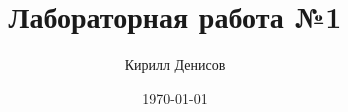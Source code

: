 \documentclass[a4paper,14pt]{extarticle}
\author{Кирилл Денисов}
\title{Лабораторная работа №1}
\date{\today}
\newcommand{\pathToCommonFolder}{/home/denilai/Documents/repos/latex/Common}
\begin{document}
	
	\gdef\capnames{
		\gdef\figurename{Рисунок}
		\gdef\chaptername{ГЛАВА}
		\gdef\appendixname{ПРИЛОЖЕНИЕ}
		\gdef\bibname{СПИСОК ЛИТЕРАТУРЫ}
		\gdef\contentsname{СОДЕРЖАНИЕ}
		
	}
	
	
	\thispagestyle{empty}
	
	\newpage
	
\end{document}
